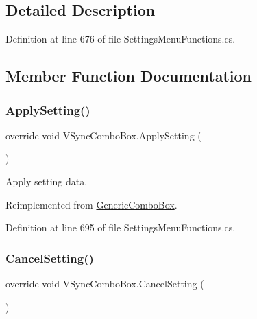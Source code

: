 \subsection{Detailed Description}


Definition at line 676 of file Settings\+Menu\+Functions.\+cs.



\subsection{Member Function Documentation}
\mbox{\label{class_v_sync_combo_box_a5d6d9a0895ae75f608a7107ce1ef5d31}} 
\subsubsection{\texorpdfstring{Apply\+Setting()}{ApplySetting()}}
{\footnotesize\ttfamily override void V\+Sync\+Combo\+Box.\+Apply\+Setting (\begin{DoxyParamCaption}{ }\end{DoxyParamCaption})\hspace{0.3cm}{\ttfamily [virtual]}}



Apply setting data. 



Reimplemented from \hyperlink{class_generic_combo_box_a5aced71f035bd463a4ebaaffe19ec547}{Generic\+Combo\+Box}.



Definition at line 695 of file Settings\+Menu\+Functions.\+cs.

\mbox{\label{class_v_sync_combo_box_a76f577ef0c4f59871313a824ef98058e}} 
\subsubsection{\texorpdfstring{Cancel\+Setting()}{CancelSetting()}}
{\footnotesize\ttfamily override void V\+Sync\+Combo\+Box.\+Cancel\+Setting (\begin{DoxyParamCaption}{ }\end{DoxyParamCaption})\hspace{0.3cm}{\ttfamily [virtual]}}



